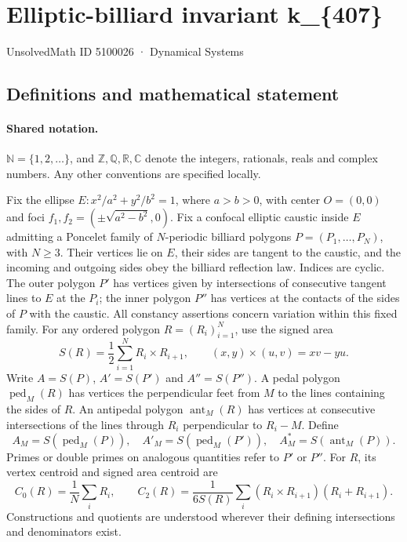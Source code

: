 \documentclass[11pt]{article}
\begin{document}
\setcounter{section}{5100025}
\section{Elliptic-billiard invariant k\_\{407\}}\label{5100026}
{\small\sffamily UnsolvedMath ID 5100026 · Dynamical Systems}
\subsection{Definitions and mathematical statement}

\paragraph{Shared notation.}$\mathbb N=\{1,2,\ldots\}$, and $\mathbb Z,\mathbb Q,\mathbb R,\mathbb C$ denote the integers, rationals, reals and complex numbers. Any other conventions are specified locally.


Fix the ellipse $E:x^2/a^2+y^2/b^2=1$, where $a>b>0$, with center $O=(0,0)$ and foci $f_1,f_2=(\pm\sqrt{a^2-b^2},0)$. Fix a confocal elliptic caustic inside $E$ admitting a Poncelet family of $N$-periodic billiard polygons $P=(P_1,\ldots,P_N)$, with $N\geq3$. Their vertices lie on $E$, their sides are tangent to the caustic, and the incoming and outgoing sides obey the billiard reflection law. Indices are cyclic. The outer polygon $P'$ has vertices given by intersections of consecutive tangent lines to $E$ at the $P_i$; the inner polygon $P''$ has vertices at the contacts of the sides of $P$ with the caustic. All constancy assertions concern variation within this fixed family.
For any ordered polygon $R=(R_i)_{i=1}^N$, use the signed area
\[S(R)=\frac12\sum_{i=1}^N R_i\times R_{i+1},\qquad (x,y)\times(u,v)=xv-yu.\]
Write $A=S(P)$, $A'=S(P')$ and $A''=S(P'')$. A pedal polygon $\operatorname{ped}_M(R)$ has vertices the perpendicular feet from $M$ to the lines containing the sides of $R$. An antipedal polygon $\operatorname{ant}_M(R)$ has vertices at consecutive intersections of the lines through $R_i$ perpendicular to $R_i-M$. Define
\[A_M=S(\operatorname{ped}_M(P)),\quad A'_M=S(\operatorname{ped}_M(P')),\quad A_M^*=S(\operatorname{ant}_M(P)).\]
Primes or double primes on analogous quantities refer to $P'$ or $P''$. For $R$, its vertex centroid and signed area centroid are
\[C_0(R)=\frac1N\sum_i R_i,\qquad C_2(R)=\frac{1}{6S(R)}\sum_i(R_i\times R_{i+1})(R_i+R_{i+1}).\]
Constructions and quotients are understood wherever their defining intersections and denominators exist.
\end{document}

